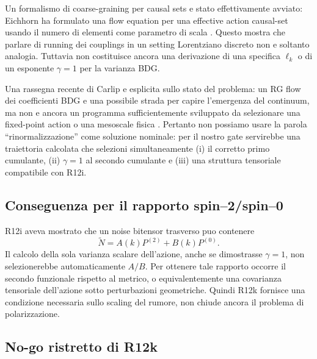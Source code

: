 \documentclass[11pt,a4paper]{article}
\begin{document}
Un formalismo di coarse-graining per causal sets e stato effettivamente avviato: Eichhorn ha formulato una flow equation per una effective action causal-set usando il numero di elementi come parametro di scala \cite{Eichhorn2018}. Questo mostra che parlare di running dei couplings in un setting Lorentziano discreto non e soltanto analogia. Tuttavia non costituisce ancora una derivazione di una specifica $\ell_k$ o di un esponente $\gamma=1$ per la varianza BDG.

Una rassegna recente di Carlip e esplicita sullo stato del problema: un RG flow dei coefficienti BDG e una possibile strada per capire l'emergenza del continuum, ma non e ancora un programma sufficientemente sviluppato da selezionare una fixed-point action o una mesoscale fisica \cite{Carlip2024}. Pertanto non possiamo usare la parola ``rinormalizzazione'' come soluzione nominale: per il nostro gate servirebbe una traiettoria calcolata che selezioni simultaneamente (i) il corretto primo cumulante, (ii) $\gamma=1$ al secondo cumulante e (iii) una struttura tensoriale compatibile con R12i.

\subsection{Conseguenza per il rapporto spin--2/spin--0}

R12i aveva mostrato che un noise bitensor trasverso puo contenere
\begin{equation}
 \widetilde N=A(k)P^{(2)}+B(k)P^{(0)}.
\end{equation}
Il calcolo della sola varianza scalare dell'azione, anche se dimostrasse $\gamma=1$, non selezionerebbe automaticamente $A/B$. Per ottenere tale rapporto occorre il secondo funzionale rispetto al metrico, o equivalentemente una covarianza tensoriale dell'azione sotto perturbazioni geometriche. Quindi R12k fornisce una condizione necessaria sullo scaling del rumore, non chiude ancora il problema di polarizzazione.

\subsection{No-go ristretto di R12k}
\end{document}
